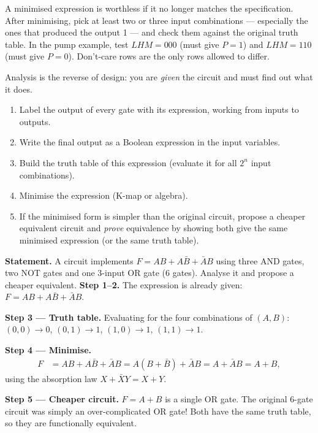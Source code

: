 \documentclass[11pt]{article}
\newcounter{popsec}
\newcounter{popsub}
\newcommand{\courssub}[1]{%
  \stepcounter{popsub}%
  \par\vspace{9pt}\noindent{\popxbold\fontsize{11.5}{13}\selectfont\color{popink}{\color{poporange}\thepopsec.\thepopsub}\hspace{6pt}#1}\par\nopagebreak\vspace{4pt}
}
\begin{document}
\begin{attention}
A minimised expression is worthless if it no longer matches the specification. After minimising, pick at least two or three input combinations — especially the ones that produced the output 1 — and check them against the original truth table. In the pump example, test $LHM = 000$ (must give $P=1$) and $LHM = 110$ (must give $P=0$). Don't-care rows are the only rows allowed to differ.
\end{attention}

\courssub{Analysing an Existing Circuit}

Analysis is the reverse of design: you are \emph{given} the circuit and must find out what it does.

\begin{methode}
\begin{enumerate}
\item Label the output of every gate with its expression, working from inputs to outputs.
\item Write the final output as a Boolean expression in the input variables.
\item Build the truth table of this expression (evaluate it for all $2^n$ input combinations).
\item Minimise the expression (K-map or algebra).
\item If the minimised form is simpler than the original circuit, propose a cheaper equivalent circuit and \emph{prove} equivalence by showing both give the same minimised expression (or the same truth table).
\end{enumerate}
\end{methode}

\begin{exoresolu}
\textbf{Statement.} A circuit implements $F = AB + A\bar{B} + \bar{A}B$ using three AND gates, two NOT gates and one 3-input OR gate (6 gates). Analyse it and propose a cheaper equivalent.
\tcblower
\textbf{Step 1–2.} The expression is already given: $F = AB + A\bar{B} + \bar{A}B$.

\textbf{Step 3 — Truth table.} Evaluating for the four combinations of $(A,B)$: $(0,0)\to 0$, $(0,1)\to 1$, $(1,0)\to 1$, $(1,1)\to 1$.

\textbf{Step 4 — Minimise.}
\begin{align*}
F &= AB + A\bar{B} + \bar{A}B = A(B+\bar{B}) + \bar{A}B = A + \bar{A}B = A + B,
\end{align*}
using the absorption law $X + \bar{X}Y = X + Y$.

\textbf{Step 5 — Cheaper circuit.} $F = A + B$ is a single OR gate. The original 6-gate circuit was simply an over-complicated OR gate! Both have the same truth table, so they are functionally equivalent.
\end{exoresolu}
\end{document}
